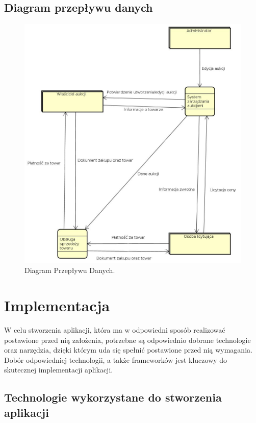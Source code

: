 \documentclass[brudnopis]{xmgr}
\begin{document}
\newpage

\section{Diagram przepływu danych}
\begin{figure}[!tbh]
\centering
\includegraphics[width=\linewidth]{fig/DFD}
\caption{Diagram Przepływu Danych.}
\end{figure}

\chapter{Implementacja}
W celu stworzenia aplikacji, która ma w odpowiedni sposób realizować postawione przed nią
założenia, potrzebne są odpowiednio dobrane technologie oraz narzędzia, dzięki którym uda się 
spełnić postawione przed nią wymagania. Dobór odpowiedniej technologii, a także frameworków 
jest kluczowy do skutecznej implementacji aplikacji.

\section{Technologie wykorzystane do stworzenia aplikacji}
\end{document}
